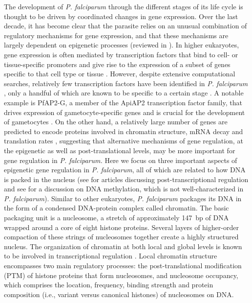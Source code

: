 The development of \textit{P. falciparum} through the different stages of its life
cycle is thought to be driven by coordinated changes in gene expression. Over
the last decade, it has become clear that the parasite relies on an unusual
combination of regulatory mechanisms for gene expression, and that these
mechanisms are largely dependent on epigenetic processes (reviewed in
\citep{cui:chromatin-mediated, duffy:role, hoeijmakers:placing,
horrocks:control, deitsch:mechanisms, voss:epigenetic}).
In higher eukaryotes, gene expression is often mediated by transcription
factors that bind to cell- or tissue-specific promoters and give rise to the
expression of a subset of genes specific to that cell type or tissue
\citep{dunham:integrated}.
However, despite extensive computational searches, relatively few
transcription factors have been identified in \textit{P. falciparum}
\citep{balaji:discovery, coulson:comparative}, only a
handful of which are known to be specific to a certain stage
\citep{campbell:identification}. A notable
example is PfAP2-G, a member of the ApiAP2 transcription factor family, that
drives expression of gametocyte-specific genes and is crucial for the
development of gametocytes \citep{kafsack:transcriptional, sinha:cascade}.
On the other hand, a relatively large
number of genes are predicted to encode proteins involved in chromatin
structure, mRNA decay and translation rates \citep{coulson:comparative},
suggesting that alternative
mechanisms of gene regulation, at the epigenetic as well as post-translational
levels, may be more important for gene regulation in \textit{P. falciparum.}
Here we focus on three important aspects of epigenetic gene regulation in
\textit{P.
falciparum}, all of which are related to how DNA is packed in the nucleus (see
\citet{chung:post-translational, leroch:genomics, suvorova:transcript,
kramer:rna, bunnik:polysome}
 for articles discussing post-transcriptional regulation and see
 \citet{ponts:genome-wide}
for a discussion on DNA methylation, which is not well-characterized in
\textit{P.
falciparum}). Similar to other eukaryotes, \textit{P. falciparum }packages its DNA in
the form of a condensed DNA-protein complex called chromatin. The basic
packaging unit is a nucleosome, a stretch of approximately 147~bp of DNA
wrapped around a core of eight histone proteins. Several layers of
higher-order compaction of these strings of nucleosomes together create a
highly structured nucleus. The organization of chromatin at both local and
global levels is known to be involved in transcriptional regulation
\citep{jenuwein:translating,zentner:regulation, nora:segmental,
belmont:large-scale}.
Local chromatin structure encompasses two main regulatory processes: the
post-translational modification (PTM) of histone proteins that form
nucleosomes, and nucleosome occupancy, which comprises the location,
frequency, binding strength and protein composition (i.e., variant versus
canonical histones) of nucleosomes on DNA.

